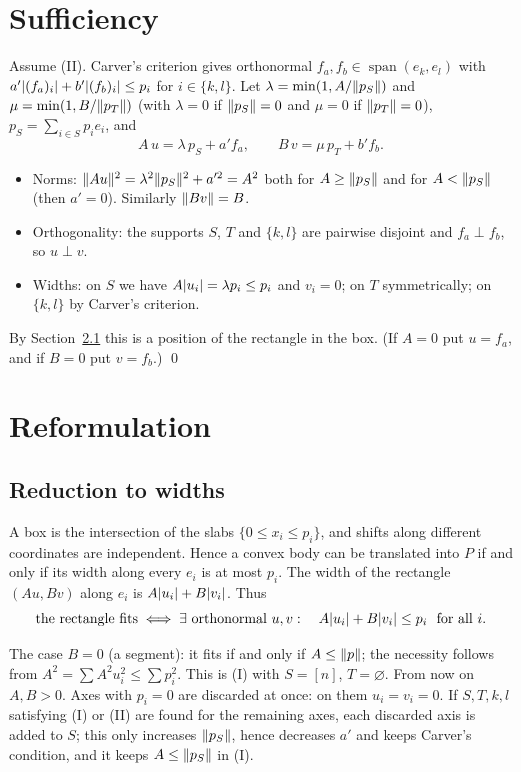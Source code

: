 \documentclass[11pt]{article}
\theoremstyle{definition}
\theoremstyle{remark}
\DeclarePairedDelimiter{\abs}{\lvert}{\rvert}
\DeclarePairedDelimiter{\norm}{\lVert}{\rVert}
\begin{document}
\section{Sufficiency}\label{sec:suff}

Assume (II). Carver's criterion gives orthonormal $f_a,f_b\in\operatorname{span}(e_k,e_l)$ with
$a'\abs{(f_a)_i}+b'\abs{(f_b)_i}\le p_i$ for $i\in\{k,l\}$. Let $\lambda=\min(1,A/\norm{p_S})$ and $\mu=\min(1,B/\norm{p_T})$ (with $\lambda=0$ if $\norm{p_S}=0$ and $\mu=0$ if $\norm{p_T}=0$), $p_S=\sum_{i\in S}p_ie_i$, and
\[
A\,u=\lambda\,p_S+a'f_a,\qquad B\,v=\mu\,p_T+b'f_b .
\]
\begin{itemize}
\item Norms: $\norm{Au}^2=\lambda^2\norm{p_S}^2+a'^2=A^2$ both for $A\ge\norm{p_S}$ and for
$A<\norm{p_S}$ (then $a'=0$). Similarly $\norm{Bv}=B$.
\item Orthogonality: the supports $S$, $T$ and $\{k,l\}$ are pairwise disjoint and $f_a\perp f_b$,
so $u\perp v$.
\item Widths: on $S$ we have $A\abs{u_i}=\lambda p_i\le p_i$ and $v_i=0$; on $T$ symmetrically; on
$\{k,l\}$ by Carver's criterion.
\end{itemize}
By Section~\ref{sec:widths} this is a position of the rectangle in the box. (If $A=0$ put $u=f_a$, and if
$B=0$ put $v=f_b$.) \qed

\section{Reformulation}\label{sec:reform}

\subsection{Reduction to widths}\label{sec:widths}
A box is the intersection of the slabs $\{0\le x_i\le p_i\}$, and shifts along different coordinates are
independent. Hence a convex body can be translated into $P$ if and only if its width along every $e_i$
is at most $p_i$. The width of the rectangle $(Au,Bv)$ along $e_i$ is $A\abs{u_i}+B\abs{v_i}$. Thus
\begin{equation}\label{eq:widths}
\text{the rectangle fits}\iff\exists\ \text{orthonormal } u,v:\quad A\abs{u_i}+B\abs{v_i}\le p_i\ \ \text{for all } i .
\end{equation}

The case $B=0$ (a segment): it fits if and only if $A\le\norm{p}$; the necessity follows from
$A^2=\sum A^2u_i^2\le\sum p_i^2$. This is (I) with $S=[n]$, $T=\varnothing$. From now on $A,B>0$.
Axes with $p_i=0$ are discarded at once: on them $u_i=v_i=0$. If $S,T,k,l$ satisfying (I) or (II) are
found for the remaining axes, each discarded axis is added to $S$; this only increases $\norm{p_S}$,
hence decreases $a'$ and keeps Carver's condition, and it keeps $A\le\norm{p_S}$ in (I).
\end{document}
